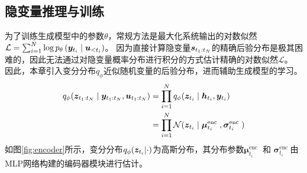 \subsection{隐变量推理与训练}
为了训练生成模型中的参数$\theta$，常规方法是最大化系统输出的对数似然$\mathcal{L}=\sum_{i=1}^N\log p_{\theta}\left( \boldsymbol{y}_{t_i} \mid  \boldsymbol u_{<t_i}  \right)$。
因为直接计算隐变量$\boldsymbol{s}_{t_1:t_N}$的精确后验分布是极其困难的，因此无法通过对隐变量概率分布进行积分的方式估计精确的对数似然$\mathcal{L}$。
因此，本章引入变分分布$q_\phi$近似随机变量的后验分布，进而辅助生成模型的学习。
\begin{equation}
\begin{aligned}
 q_{\phi}(\boldsymbol z_{t_1:t_N}\mid\boldsymbol y_{t_1:t_N},\boldsymbol u_{t_1:t_N}) &= \prod_{i=1}^{N} q_{\phi}(\boldsymbol z_{t_i}\mid \boldsymbol{h}_{t_i},\boldsymbol{y}_{t_i})\\
 &= \prod_{i=1}^{N} \mathcal{N}(\boldsymbol{z}_{t_i}\mid\boldsymbol{\mu}_{t_i}^{\text {enc }}, \boldsymbol{\sigma}_{t_i}^{\text {enc }})  
 \label{equ:posterior_z}
\end{aligned}
\end{equation}
如图\ref{fig:encoder}所示，变分分布$q_\phi(\boldsymbol{z}_{t_i}|\cdot)$为高斯分布，其分布参数$\boldsymbol{\mu}_{t_i}^{\text {enc }}$ 和 $\boldsymbol{\sigma}_{t_i}^{\text {enc }}$由MLP网络构建的编码器模块进行估计。
